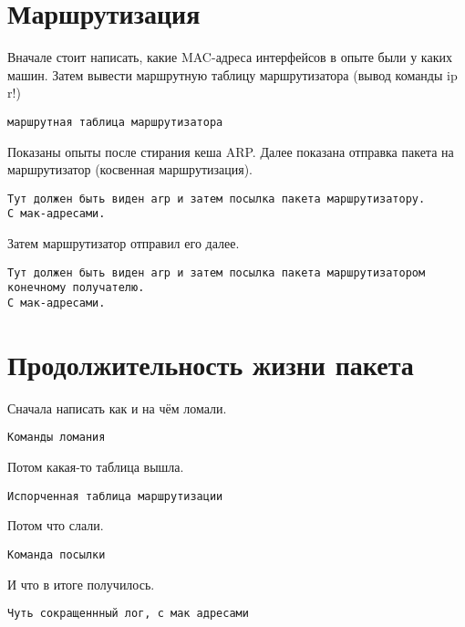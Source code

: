 \documentclass[a4paper,12pt]{article}
\begin{document}
\section{Маршрутизация}


Вначале стоит написать, какие MAC-адреса интерфейсов в опыте были у каких машин.
Затем вывести маршрутную таблицу маршрутизатора (вывод команды ip r!)

\begin{Verbatim}
маршрутная таблица маршрутизатора
\end{Verbatim}

Показаны опыты после стирания кеша ARP.
Далее показана отправка пакета на маршрутизатор (косвенная маршрутизация). 

\begin{Verbatim}
Тут должен быть виден arp и затем посылка пакета маршрутизатору. 
С мак-адресами.
\end{Verbatim}

Затем маршрутизатор отправил его далее.

\begin{Verbatim}
Тут должен быть виден arp и затем посылка пакета маршрутизатором конечному получателю. 
С мак-адресами.
\end{Verbatim}

\section{Продолжительность жизни пакета}

Сначала написать как и на чём ломали. 

\begin{Verbatim}
Команды ломания
\end{Verbatim}

Потом какая-то таблица вышла.

\begin{Verbatim}
Испорченная таблица маршрутизации
\end{Verbatim}

Потом что слали.

\begin{Verbatim}
Команда посылки
\end{Verbatim}

И что в итоге получилось.

\begin{Verbatim}
Чуть сокращеннный лог, с мак адресами
\end{Verbatim}
\end{document}

